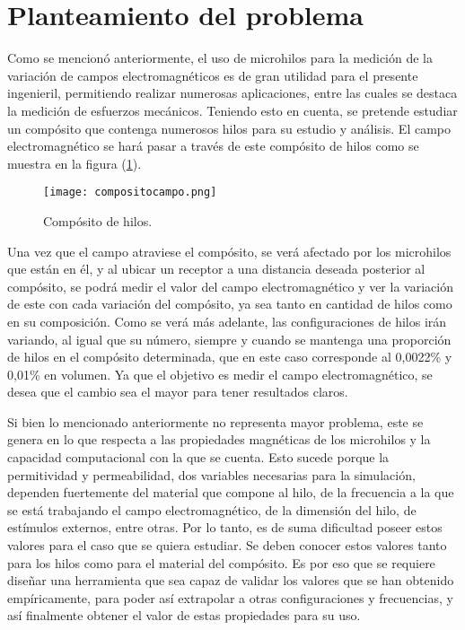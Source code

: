\documentclass[12pt,letterpaper]{article}
\numberwithin{equation}{section}
\begin{document}
\pagebreak

\section{Planteamiento del problema}

Como se mencionó anteriormente, el uso de microhilos para la medición de la variación de campos electromagnéticos es de gran utilidad para el presente ingenieril, permitiendo realizar numerosas aplicaciones, entre las cuales se destaca la medición de esfuerzos mecánicos. Teniendo esto en cuenta, se pretende estudiar un compósito que contenga numerosos hilos para su estudio y análisis. El campo electromagnético se hará pasar a través de este compósito de hilos como se muestra en la figura (\ref{fig: compositoproblema.png}).

\begin{figure}[H]
	\centering\texttt{[image: compositocampo.png]}
	\caption{Compósito de hilos. \cite{Wire_theory_3}}
	\label{fig: compositoproblema.png}
\end{figure} 

Una vez que el campo atraviese el compósito, se verá afectado por los microhilos que están en él, y al ubicar un receptor a una distancia deseada posterior al compósito, se podrá medir el valor del campo electromagnético y ver la variación de este con cada variación del compósito, ya sea tanto en cantidad de hilos como en su composición. Como se verá más adelante, las configuraciones de hilos irán variando, al igual que su número, siempre y cuando se mantenga una proporción de hilos en el compósito determinada, que en este caso corresponde al 0,0022\% y 0,01\% en volumen. Ya que el objetivo es medir el campo electromagnético, se desea que el cambio sea el mayor para tener resultados claros.

Si bien lo mencionado anteriormente no representa mayor problema, este se genera en lo que respecta a las propiedades magnéticas de los microhilos y la capacidad computacional con la que se cuenta. Esto sucede porque la permitividad y permeabilidad, dos variables necesarias para la simulación, dependen fuertemente del material que compone al hilo, de la frecuencia a la que se está trabajando el campo electromagnético, de la dimensión del hilo, de estímulos externos, entre otras. Por lo tanto, es de suma dificultad poseer estos valores para el caso que se quiera estudiar. Se deben conocer estos valores tanto para los hilos como para el material del compósito. Es por eso que se requiere diseñar una herramienta que sea capaz de validar los valores que se han obtenido empíricamente, para poder así extrapolar a otras configuraciones y frecuencias, y así finalmente obtener el valor de estas propiedades para su uso.
 
\end{document}

